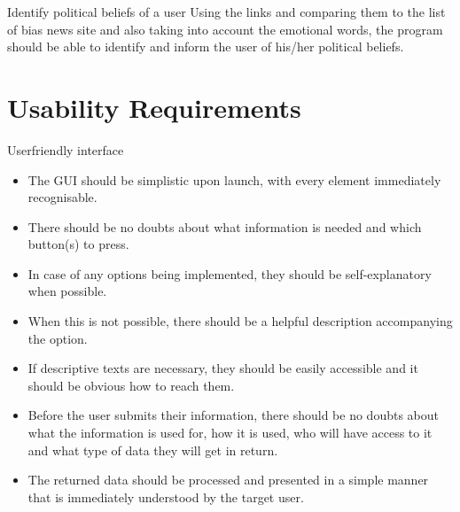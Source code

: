 \begin{requirement}{Identify political beliefs of a user }
Using the links and comparing them to the list of bias news site and also taking
into account the emotional words, the program should be able to identify and
inform the user of his/her political beliefs. 
\end{requirement}



\section{Usability Requirements}

\begin{requirement}{Userfriendly interface}
\begin{itemize}
  \item The \ac{GUI} should be simplistic upon launch, with every element immediately recognisable.
  \item There should be no doubts about what information is needed and which button(s) to press.
  \item In case of any options being implemented, they should be self-explanatory when possible.
  \item When this is not possible, there should be a helpful description
  accompanying the option.
  \item If descriptive texts are necessary, they should be easily accessible and
  it should be obvious how to reach them.
  \item Before the user submits their information, there should be no doubts
  about what the information is used for, how it is used, who will have access to it and what type of data they will get in return.
  \item The returned data should be processed and presented in a simple manner that is immediately understood by the
        target user.
\end{itemize}
\end{requirement}